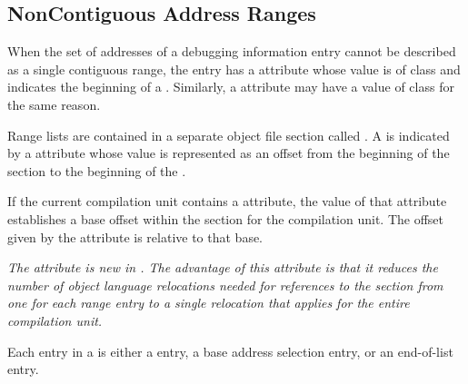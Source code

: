 \subsection{Non\dash Contiguous Address Ranges}
\label{chap:noncontiguousaddressranges}
When the set of addresses of a debugging information entry
cannot be described as a single contiguous range, the entry has
a \DWATranges{} attribute 
whose value is of class 
and indicates the beginning of a .
Similarly,
a \DWATstartscope{} attribute 
may have a value of class
 for the same reason.  

Range lists are contained in a separate object file section called 
\dotdebugranges{}. A
 is indicated by a 
\DWATranges{} attribute whose
value is represented as an offset from the beginning of the
\dotdebugranges{} section to the beginning of the 
.

If the current compilation unit contains a \DWATrangesbase{}
attribute, the value of that attribute establishes a base
offset within the \dotdebugranges{} section for the compilation
unit. The offset given by the \DWATranges{} attribute is
relative to that base.

\textit{The \DWATrangesbase{} attribute is new in \DWARFVersionV.
The advantage of this attribute is that it reduces the number of
object language relocations needed for references to the \dotdebugranges{}
section from one for each range entry to a single relocation that
applies for the entire compilation unit.}

Each entry in a  is either a 
 entry,
a base address selection entry, or an 
end-of-list entry.

